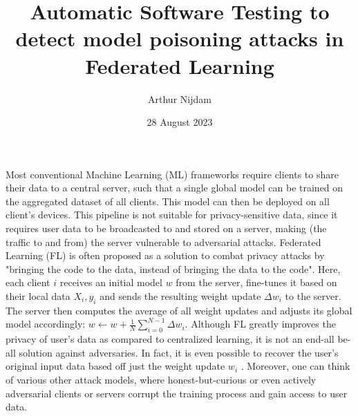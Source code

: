 \documentclass[11pt]{article}
\title{Automatic Software Testing to detect model poisoning attacks in Federated Learning}
\author{Arthur Nijdam}
\date{28 August 2023}
\begin{document}
\maketitle






Most conventional Machine Learning (ML) frameworks require clients to share their data to a central server, such that a single global model can be trained on the aggregated dataset of all clients. This model can then be deployed on all client's devices. This pipeline is not suitable for privacy-sensitive data, since it requires user data to be broadcasted to and stored on a server, making (the traffic to and from) the server vulnerable to adversarial attacks. %
Federated Learning (FL) \cite{mcmahan2017} is often proposed as a solution to combat privacy attacks by "bringing the code to the data, instead of bringing the data to the code". Here, each client $i$ receives an initial model $w$ from the server, fine-tunes it based on their local data $X_i, y_i$ and sends the resulting weight update $\Delta w_i$ to the server. The server then computes the average of all weight updates and adjusts its global model accordingly: $w \leftarrow w + \frac{1}{N}\sum_{i=0}^{N-1}  \Delta w_i$. Although FL greatly improves the privacy of user's data as compared to centralized learning, it is not an end-all be-all solution against adversaries. In fact, it is even possible to recover the user's original input data based off just the weight update $w_i$ \cite{wei2020framework}. Moreover, one can think of various other attack models, where honest-but-curious or even actively adversarial clients or servers corrupt the training process and gain access to user data. 
\end{document}
